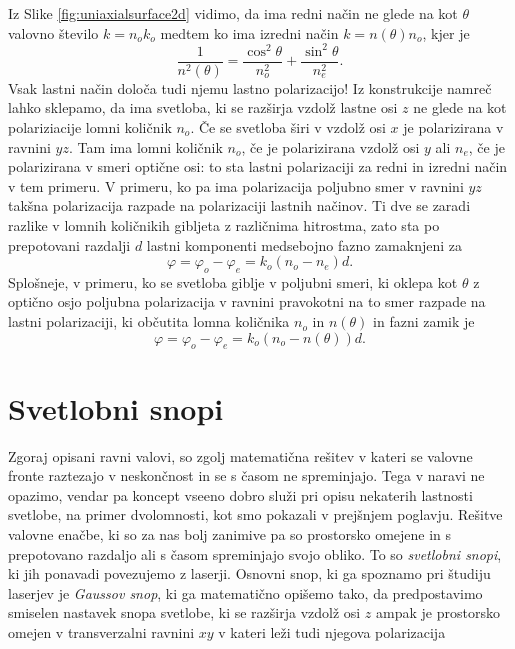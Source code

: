 \documentclass[longbibliography,slovene,a4paper,12pt]{book}
\begin{document}
Iz Slike \ref{fig:uniaxialsurface2d} vidimo, da ima redni način ne glede na kot $\theta$ valovno število $k=n_o k_o$ medtem ko ima izredni način $k=n(\theta)n_o$, kjer je 
\begin{equation}
\frac{1}{n^2(\theta)} = \frac{\cos^2 \theta}{n_o^2} + \frac{\sin^2 \theta}{n_e^2}.
\label{extraordinaryn}
\end{equation}
Vsak lastni način določa tudi njemu lastno polarizacijo! Iz konstrukcije namreč lahko sklepamo, da ima svetloba, ki se razširja vzdolž lastne osi $z$ ne glede na kot polariziacije lomni količnik $n_o$. Če se svetloba širi v vzdolž osi $x$ je polarizirana v ravnini $yz$. Tam ima lomni količnik $n_o$, če je polarizirana vzdolž osi $y$ ali $n_e$, če je polarizirana v smeri optične osi: to sta lastni polarizaciji za redni in izredni način v tem primeru. V primeru, ko pa ima polarizacija poljubno smer v ravnini $yz$ takšna polarizacija razpade na polarizaciji lastnih načinov\cite{saleh}. Ti dve se zaradi razlike v lomnih količnikih gibljeta z različnima hitrostma, zato sta po prepotovani razdalji $d$ lastni komponenti medsebojno fazno zamaknjeni za 
\begin{equation}
\varphi = \varphi_o - \varphi_e = k_o(n_o - n_e)d.
\end{equation}
Splošneje, v primeru, ko se svetloba giblje v poljubni smeri, ki oklepa kot $\theta$ z optično osjo poljubna polarizacija v ravnini pravokotni na to smer razpade na lastni polarizaciji, ki občutita lomna količnika $n_o$ in $n(\theta)$ in fazni zamik je
\begin{equation}
\varphi = \varphi_o - \varphi_e = k_o(n_o - n(\theta))d.
\end{equation}


\section{Svetlobni snopi}
Zgoraj opisani ravni valovi, so zgolj matematična rešitev v kateri se valovne fronte raztezajo v neskončnost in se s časom ne spreminjajo. Tega v naravi ne opazimo, vendar pa koncept vseeno dobro služi pri opisu nekaterih lastnosti svetlobe, na primer dvolomnosti, kot smo pokazali v prejšnjem poglavju. Rešitve valovne enačbe, ki so za nas bolj zanimive pa so prostorsko omejene in s prepotovano razdaljo ali s časom spreminjajo svojo obliko. To so \emph{svetlobni snopi}, ki jih ponavadi povezujemo z laserji. Osnovni snop, ki ga spoznamo pri študiju laserjev je \emph{Gaussov snop}, ki ga matematično opišemo tako, da predpostavimo smiselen nastavek snopa svetlobe, ki se razširja vzdolž osi $z$ ampak je prostorsko omejen v transverzalni ravnini $xy$ v kateri leži tudi njegova polarizacija
\end{document}
